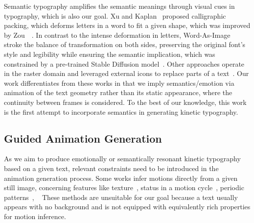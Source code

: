 Semantic typography amplifies the semantic meanings through visual cues in typography, which is also our goal.
Xu and Kaplan~\cite{xu2007calligraphic} proposed calligraphic packing, which deforms letters in a word to fit a given shape, which was improved by Zou~\ea~\cite{zou2016legible}.
In contrast to the intense deformation in letters, Word-As-Image~\cite{iluz2023word} stroke the balance of transformation on both sides, preserving the original font's style and legibility while ensuring the semantic implication, which was constrained by a pre-trained Stable Diffusion model~\cite{rombach2022high}.
Other approaches operate in the raster domain and leveraged external icons to replace parts of a text~\cite{tendulkar2019trick, zhang2017synthesizing}.
Our work differentiates from these works in that we imply semantics/emotion via animation of the text geometry rather than its static appearance, where the continuity between frames is considered.
To the best of our knowledge, this work is the first attempt to incorporate semantics in generating kinetic typography.




\subsection{Guided Animation Generation}
As we aim to produce emotionally or semantically resonant kinetic typography based on a given text, relevant constraints need to be introduced in the animation generation process.
Some works infer motions directly from a given still image, concerning features like texture~\cite{chuang2005animating, kazi2014draco, lai2016data}, status in a motion cycle~\cite{xu2008animating}, periodic patterns~\cite{halperin2021endless}, \etc~
These methods are unsuitable for our goal because a text usually appears with no background and is not equipped with equivalently rich properties for motion inference.

